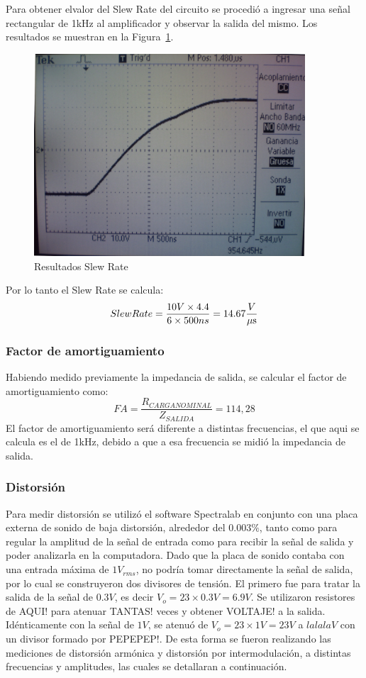 Para obtener elvalor del Slew Rate del circuito se procedió a ingresar una señal rectangular de 1kHz al amplificador y observar la salida del mismo. Los resultados se muestran en la Figura~\ref{slew_rate_completo}.

\begin{figure}[H]
\centering
\includegraphics[width=0.9\textwidth]{img/slew_rate_salida.jpg}
\caption{Resultados Slew Rate}
\label{slew_rate_completo} 
\end{figure}


Por lo tanto el Slew Rate se calcula:
$$
Slew Rate =\frac{10V \times 4.4}{6 \times 500ns} = 14.67 \frac{V}{\mu\mbox{s}}
$$
\medskip
\subsubsection{Factor de amortiguamiento}

Habiendo medido previamente la impedancia de salida, se calcular el factor de amortiguamiento
como: 
$$
FA = \frac{R_{CARGA NOMINAL}}{Z_{SALIDA}} = 114,28
$$
El factor de amortiguamiento será diferente a distintas frecuencias, el que aqui se calcula es el de 1kHz, debido a que a esa frecuencia se midió la impedancia de salida.

\subsubsection{Distorsión}

Para medir distorsión se utilizó el software Spectralab en conjunto con una placa externa de sonido de baja distorsión, alrededor del $0.003\%$, tanto como para regular la amplitud de la señal de entrada como para recibir la señal de salida y poder analizarla en la computadora.
Dado que la placa de sonido contaba con una entrada máxima de $1V_{rms}$, no podría tomar directamente la señal de salida, por lo cual se construyeron dos divisores de tensión. El primero fue para tratar la salida de la señal de $0.3V$, es decir $V_o=23\times0.3V=6.9V$. Se utilizaron resistores de AQUI! para atenuar TANTAS! veces y obtener VOLTAJE! a la salida. Idénticamente con la señal de $1V$, se atenuó de $V_o=23\times1V=23V$ a $lalalaV$ con un divisor formado por PEPEPEP!.
De esta forma se fueron realizando las mediciones de distorsión armónica y distorsión por intermodulación, a distintas frecuencias y amplitudes, las cuales se detallaran a continuación.


